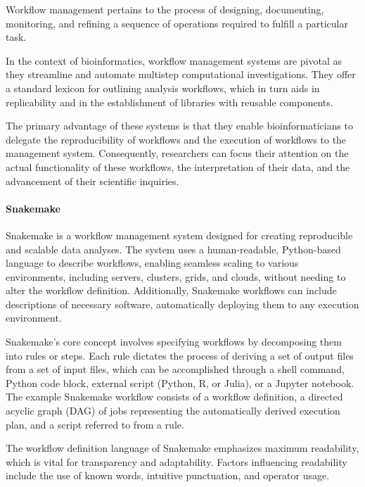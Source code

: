            Workflow management pertains to the process of designing, documenting, monitoring, and refining a sequence of operations required to fulfill a particular task.
        
            In the context of bioinformatics, workflow management systems are pivotal as they streamline and automate multistep computational investigations. They offer a standard lexicon for outlining analysis workflows, which in turn aids in replicability and in the establishment of libraries with reusable components.
            
            The primary advantage of these systems is that they enable bioinformaticians to delegate the reproducibility of workflows and the execution of workflows to the management system. Consequently, researchers can focus their attention on the actual functionality of these workflows, the interpretation of their data, and the advancement of their scientific inquiries.
            
            \paragraph*{Snakemake}
                Snakemake is a workflow management system designed for creating reproducible and scalable data analyses. The system uses a human-readable, Python-based language to describe workflows, enabling seamless scaling to various environments, including servers, clusters, grids, and clouds, without needing to alter the workflow definition. Additionally, Snakemake workflows can include descriptions of necessary software, automatically deploying them to any execution environment\cite{molder2021sustainable}.
                
                Snakemake's core concept involves specifying workflows by decomposing them into rules or steps. Each rule dictates the process of deriving a set of output files from a set of input files, which can be accomplished through a shell command, Python code block, external script (Python, R, or Julia), or a Jupyter notebook. The example Snakemake workflow consists of a workflow definition, a directed acyclic graph (DAG) of jobs representing the automatically derived execution plan, and a script referred to from a rule.
           
                The workflow definition language of Snakemake emphasizes maximum readability, which is vital for transparency and adaptability. Factors influencing readability include the use of known words, intuitive punctuation, and operator usage. 
                
